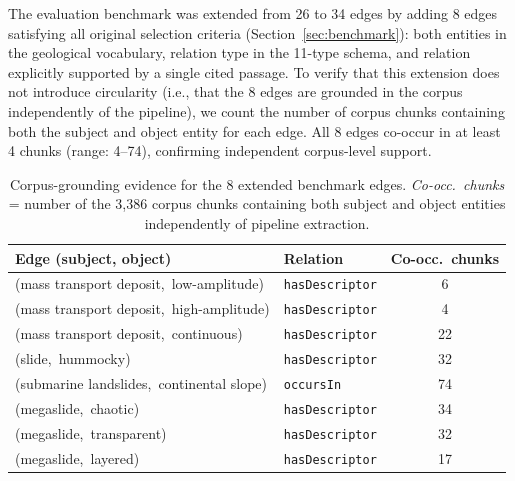 \documentclass[10pt]{article}
\newcommand{\pred}[1]{\texttt{\small #1}}
\begin{document}
The evaluation benchmark was extended from 26 to 34 edges by adding
8 edges satisfying all original selection criteria
(Section~\ref{sec:benchmark}):
both entities in the geological vocabulary, relation type in the
11-type schema, and relation explicitly supported by a single cited
passage.
To verify that this extension does not introduce circularity
(i.e., that the 8 edges are grounded in the corpus independently
of the pipeline), we count the number of corpus chunks containing
both the subject and object entity for each edge.
All 8 edges co-occur in at least 4 chunks (range: 4--74),
confirming independent corpus-level support.

\begin{table}[htb]
\centering
\caption{Corpus-grounding evidence for the 8 extended benchmark
  edges. \emph{Co-occ.\ chunks} = number of the 3{,}386 corpus
  chunks containing both subject and object entities independently
  of pipeline extraction.}
\label{tab:bench-extension}
\small
\begin{tabular}{p{5.2cm}lc}
\toprule
\textbf{Edge (subject, object)} & \textbf{Relation} & \textbf{Co-occ.\ chunks} \\
\midrule
(mass transport deposit,\ low-amplitude) & \pred{hasDescriptor} & 6 \\
(mass transport deposit,\ high-amplitude) & \pred{hasDescriptor} & 4 \\
(mass transport deposit,\ continuous) & \pred{hasDescriptor} & 22 \\
(slide,\ hummocky) & \pred{hasDescriptor} & 32 \\
(submarine landslides,\ continental slope) & \pred{occursIn} & 74 \\
(megaslide,\ chaotic) & \pred{hasDescriptor} & 34 \\
(megaslide,\ transparent) & \pred{hasDescriptor} & 32 \\
(megaslide,\ layered) & \pred{hasDescriptor} & 17 \\
\bottomrule
\end{tabular}
\end{table}
\end{document}
